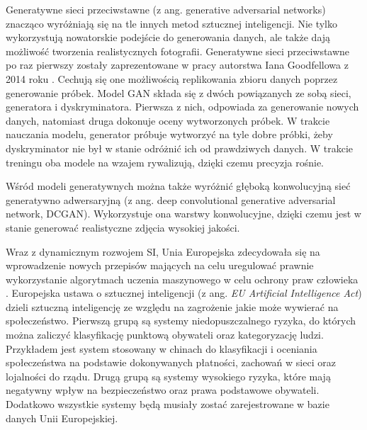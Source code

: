 \documentclass[eng,printmode]{mgr}
\begin{document}

Generatywne sieci przeciwstawne (z ang. generative adversarial networks) znacząco wyróżniają się na tle innych metod sztucznej inteligencji. Nie tylko wykorzystują nowatorskie podejście do generowania danych, ale także dają możliwość tworzenia realistycznych fotografii. Generatywne sieci przeciwstawne po raz pierwszy zostały zaprezentowane w pracy autorstwa Iana Goodfellowa z 2014 roku \cite{goodfellow2014generative}. Cechują się one możliwością replikowania zbioru danych poprzez generowanie próbek. Model GAN składa się z dwóch powiązanych ze sobą sieci, generatora i dyskryminatora. Pierwsza z nich, odpowiada za generowanie nowych danych, natomiast druga dokonuje oceny wytworzonych próbek. W trakcie nauczania modelu, generator próbuje wytworzyć na tyle dobre próbki, żeby dyskryminator nie był w stanie odróżnić ich od prawdziwych danych. W trakcie treningu oba modele na wzajem rywalizują, dzięki czemu precyzja rośnie.      

Wśród modeli generatywnych można także wyróżnić głęboką konwolucyjną sieć generatywno adwersaryjną (z ang. deep convolutional generative adversarial network, DCGAN). Wykorzystuje ona warstwy konwolucyjne, dzięki czemu jest w stanie generować realistyczne zdjęcia wysokiej jakości.  



Wraz z dynamicznym rozwojem SI, Unia Europejska zdecydowała się na wprowadzenie nowych przepisów mających na celu uregulować prawnie wykorzystanie algorytmach uczenia maszynowego w celu ochrony praw człowieka \cite{AI_Act}. Europejska ustawa o sztucznej inteligencji (z ang. \textit{EU Artificial Intelligence Act}) dzieli sztuczną inteligencję ze względu na zagrożenie jakie może wywierać na społeczeństwo. Pierwszą grupą są systemy niedopuszczalnego ryzyka, do których można zaliczyć klasyfikację punktową obywateli oraz kategoryzację ludzi. Przykładem jest system stosowany w chinach do klasyfikacji i oceniania społeczeństwa na podstawie dokonywanych płatności, zachowań w sieci oraz lojalności do rządu. Drugą grupą są systemy wysokiego ryzyka, które mają negatywny wpływ na bezpieczeństwo oraz prawa podstawowe obywateli. Dodatkowo wszystkie systemy będą musiały zostać zarejestrowane w bazie danych Unii Europejskiej.  

\end{document}
